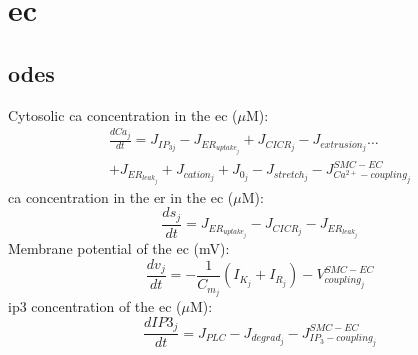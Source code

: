 \documentclass[11pt]{elsarticle}
\newcommand{\uM}{$\mu$M\xspace}
\newcommand{\ca}{\gls{ca}\xspace}
\newcommand{\ip}{\gls{ip3}\xspace}
\begin{document}
\section{\Gls{ec}}
%
\subsection{\Glspl{ode}}
%
Cytosolic \ca concentration in the \gls{ec} (\uM):
\begin{equation} \label{eq:cj}
\begin{split}
\frac{dCa_j}{dt} = J_{IP_{3j}} - J_{ER_{uptake_{j}}} + J_{CICR_{j}} - J_{extrusion_{j}}\dots \\
 + J_{ER_{leak_{j}}} + J_{cation_{j}} + J_{0_{j}} - J_{stretch_{j}} - J_{Ca^{2+}-coupling_{j}}^{SMC-EC}
\end{split}
\end{equation}
%
\ca concentration in the \gls{er} in the \gls{ec} (\uM): 
\begin{equation} \label{eq:sj}
\frac{ds_j}{dt} =  J_{ER_{uptake_{j}}} - J_{CICR_{j}} - J_{ER_{leak_{j}}}
\end{equation}
%
Membrane potential of the \gls{ec} (mV):
\begin{equation} \label{eq:dvjdt}
\frac{dv_{j}}{dt} =-\frac{1}{C_{m_{j}}} ( I_{K_{j}}+I_{R_{j}}) - V^{SMC-EC}_{coupling_{j}}
\end{equation}
%
\ip concentration of the \gls{ec} (\uM):
\begin{equation} \label{eq:dIjdt}
\frac{dIP3_{j}}{dt} =  J_{PLC}- J_{degrad_{j}}  - J^{SMC-EC}_{IP_{3}-coupling_{j}}
\end{equation}
%
\end{document}
